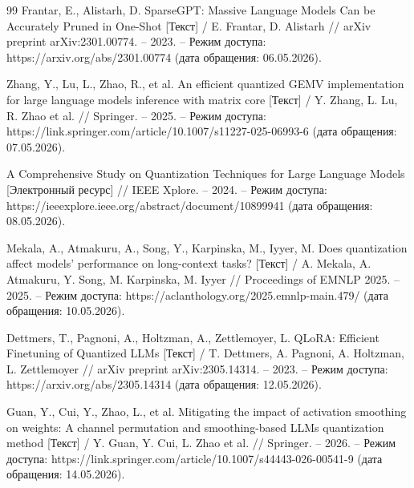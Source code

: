 \documentclass[bachelor, och, coursework]{SCWorks}
\begin{document}
\begin{thebibliography}{99}
		 Frantar, E., Alistarh, D. SparseGPT: Massive Language Models Can be Accurately Pruned in One-Shot [Текст] / E. Frantar, D. Alistarh // arXiv preprint arXiv:2301.00774. -- 2023. -- Режим доступа: https://arxiv.org/abs/2301.00774 (дата обращения: 06.05.2026).
		
		 Zhang, Y., Lu, L., Zhao, R., et al. An efficient quantized GEMV implementation for large language models inference with matrix core [Текст] / Y. Zhang, L. Lu, R. Zhao et al. // Springer. -- 2025. -- Режим доступа: https://link.springer.com/article/10.1007/s11227-025-06993-6 (дата обращения: 07.05.2026).
		
		 A Comprehensive Study on Quantization Techniques for Large Language Models [Электронный ресурс] // IEEE Xplore. -- 2024. -- Режим доступа: https://ieeexplore.ieee.org/abstract/document/10899941 (дата обращения: 08.05.2026).
		
		 Mekala, A., Atmakuru, A., Song, Y., Karpinska, M., Iyyer, M. Does quantization affect models' performance on long-context tasks? [Текст] / A. Mekala, A. Atmakuru, Y. Song, M. Karpinska, M. Iyyer // Proceedings of EMNLP 2025. -- 2025. -- Режим доступа: https://aclanthology.org/2025.emnlp-main.479/ (дата обращения: 10.05.2026).
		
		 Dettmers, T., Pagnoni, A., Holtzman, A., Zettlemoyer, L. QLoRA: Efficient Finetuning of Quantized LLMs [Текст] / T. Dettmers, A. Pagnoni, A. Holtzman, L. Zettlemoyer // arXiv preprint arXiv:2305.14314. -- 2023. -- Режим доступа: https://arxiv.org/abs/2305.14314 (дата обращения: 12.05.2026).
		
		 Guan, Y., Cui, Y., Zhao, L., et al. Mitigating the impact of activation smoothing on weights: A channel permutation and smoothing-based LLMs quantization method [Текст] / Y. Guan, Y. Cui, L. Zhao et al. // Springer. -- 2026. -- Режим доступа: https://link.springer.com/article/10.1007/s44443-026-00541-9 (дата обращения: 14.05.2026).
		
	\end{thebibliography}	
\end{document}
